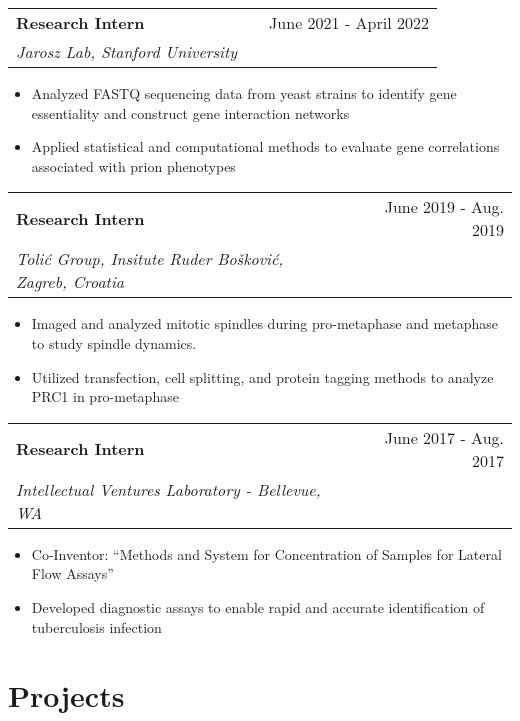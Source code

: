 \documentclass[a4paper,12pt]{article}
\makeatletter
\newenvironment{joblong}[3]
    {
    \begin{tabularx}{\linewidth}{@{}l X r@{}}
    \textbf{#1} & \hfill &  #2 \\
    \textit{#3} & & \\[3.75pt]  
    \end{tabularx}
    \begin{minipage}[t]{\linewidth}
    \begin{itemize}[nosep,after=\strut, leftmargin=1em, itemsep=3pt,label=\scriptsize$\bullet$]
    }
    {
    \end{itemize}
    \end{minipage}    
    }
\newenvironment{projectlong}[2]
    {
    \begin{tabularx}{\linewidth}{@{}l X r@{}}
    \textbf{#1} & \hfill &  #2 \\
    \end{tabularx}
    \begin{minipage}[t]{\linewidth}
    \begin{itemize}[nosep,after=\strut, leftmargin=1em, itemsep=3pt,label=\scriptsize$\bullet$]
    }
    {
    \end{itemize}
    \end{minipage}    
    }
\makeatother
\begin{document}
\begin{joblong}{Research Intern}{June 2021 - April 2022}{Jarosz Lab, Stanford University}
\item Analyzed FASTQ sequencing data from yeast strains to identify gene essentiality and construct gene interaction networks
\item Applied statistical and computational methods to evaluate gene correlations associated with prion phenotypes
\end{joblong}

\begin{joblong}{Research Intern}{June 2019 - Aug. 2019}{Tolić Group, Insitute Ruder Bošković, Zagreb, Croatia}
\item Imaged and analyzed mitotic spindles during pro-metaphase and metaphase to study spindle dynamics.
\item Utilized transfection, cell splitting, and protein tagging methods to analyze PRC1 in pro-metaphase
\end{joblong}

\begin{joblong}{Research Intern}{June 2017 - Aug. 2017}{Intellectual Ventures Laboratory - Bellevue, WA}
\item Co-Inventor: “Methods and System for Concentration of Samples for Lateral Flow Assays”
\item Developed diagnostic assays to enable rapid and accurate identification of tuberculosis infection
\end{joblong}



\section{Projects}

\end{document}
